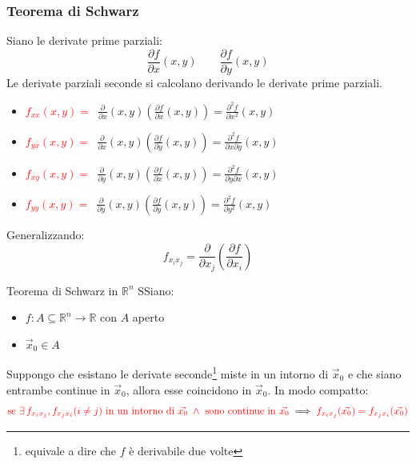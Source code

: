\documentclass{article}  %
\begin{document}
\subsubsection{Teorema di Schwarz}
\begin{osservazioni}
	Siano le derivate prime parziali:
	\[
		\frac{\partial f}{\partial x}(x,y) \quad \quad \frac{\partial f}{\partial y}(x,y)
	\]
	Le derivate parziali seconde si calcolano derivando le derivate prime parziali.
	\begin{itemize}
		\item \textcolor{red}{$f_{xx}(x,y) = \,$} $\frac{\partial}{\partial x}(x,y)\left(\frac{\partial f}{\partial x}(x,y)\right) = \frac{\partial^2 f}{\partial x^2}(x,y)$
		\item \textcolor{red}{$f_{yx}(x,y) = \,$} $\frac{\partial}{\partial x}(x,y)\left(\frac{\partial f}{\partial y}(x,y)\right) = \frac{\partial^2 f}{\partial x \partial y}(x,y)$
		\item \textcolor{red}{$f_{xy}(x,y) = \,$} $\frac{\partial}{\partial y}(x,y)\left(\frac{\partial f}{\partial x}(x,y)\right) = \frac{\partial^2 f}{\partial y \partial x}(x,y)$
		\item \textcolor{red}{$f_{yy}(x,y) = \,$} $\frac{\partial}{\partial y}(x,y)\left(\frac{\partial f}{\partial y}(x,y)\right) = \frac{\partial^2 f}{\partial y^2}(x,y)$
	\end{itemize}
	Generalizzando:
	\[
		f_{x_ix_j} = \frac{\partial}{\partial x_j}\left(\frac{\partial f}{\partial x_i}\right)
	\]
\end{osservazioni}
\begin{theorem}{Teorema di Schwarz in $\mathbb{R}^n$}
	SSiano:
	\begin{itemize}
		\item $f: A \subseteq \mathbb{R}^n \to \mathbb{R}$ con $A$ aperto
		\item $\vec{x}_0 \in A$
	\end{itemize}
	Suppongo che esistano le derivate seconde\footnote{
		equivale a dire che $f$ è derivabile due volte

	} miste in un intorno di $\vec{x}_0$ e che siano entrambe continue in $\vec{x}_0$, allora esse coincidono in $\vec{x}_0$. In modo compatto:
	\[
		\textcolor{red}{\text{se } \exists \, f_{x_ix_j}, f_{x_jx_i} (i \neq j) \text{ in un intorno di } \vec{x_0} \; \land \text{ sono continue in } \vec{x_0}} \implies  \textcolor{red}{f_{x_ix_j}(\vec{x_0}) =  f_{x_jx_i}(\vec{x_0})}
	\]
\end{theorem}
\end{document}
